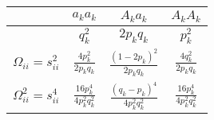 \documentclass[]{article}
\begin{document}
\begin{longtable}[]{@{}cccc@{}}
\toprule
\begin{minipage}[b]{0.20\columnwidth}\centering
\strut
\end{minipage} & \begin{minipage}[b]{0.20\columnwidth}\centering
\(a_ka_k\)\strut
\end{minipage} & \begin{minipage}[b]{0.24\columnwidth}\centering
\(A_ka_k\)\strut
\end{minipage} & \begin{minipage}[b]{0.24\columnwidth}\centering
\(A_kA_k\)\strut
\end{minipage}\tabularnewline
\midrule
\endhead
\begin{minipage}[t]{0.20\columnwidth}\centering
\strut
\end{minipage} & \begin{minipage}[t]{0.20\columnwidth}\centering
\(q_k^2\)\strut
\end{minipage} & \begin{minipage}[t]{0.24\columnwidth}\centering
\(2p_kq_k\)\strut
\end{minipage} & \begin{minipage}[t]{0.24\columnwidth}\centering
\(p_k^2\)\strut
\end{minipage}\tabularnewline
\begin{minipage}[t]{0.20\columnwidth}\centering
\(\Omega_{ii}=s^2_{ii}\)\strut
\end{minipage} & \begin{minipage}[t]{0.20\columnwidth}\centering
\(\frac{4p_k^2}{2p_kq_k}\)\strut
\end{minipage} & \begin{minipage}[t]{0.24\columnwidth}\centering
\(\frac{(1-2p_k)^2}{2p_kq_k}\)\strut
\end{minipage} & \begin{minipage}[t]{0.24\columnwidth}\centering
\(\frac{4q_k^2}{2p_kq_k}\)\strut
\end{minipage}\tabularnewline
\begin{minipage}[t]{0.20\columnwidth}\centering
\(\Omega_{ii}^2=s^4_{ii}\)\strut
\end{minipage} & \begin{minipage}[t]{0.20\columnwidth}\centering
\(\frac{16p_k^4}{4p_k^2q_k^2}\)\strut
\end{minipage} & \begin{minipage}[t]{0.24\columnwidth}\centering
\(\frac{(q_k-p_k)^4}{4p_k^2q_k^2}\)\strut
\end{minipage} & \begin{minipage}[t]{0.24\columnwidth}\centering
\(\frac{16p_k^4}{4p_k^2q_k^2}\)\strut
\end{minipage}\tabularnewline
\bottomrule
\end{longtable}
\end{document}
